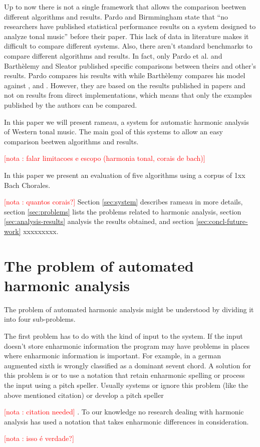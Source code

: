 \documentclass{article}
\newcounter{notacounter}
\newcommand{\nota}[1]{
  \addtocounter{notacounter}{1}
  \textcolor{red}{[nota \arabic{notacounter}: #1]}
}
\begin{document}

Up to now there is not a single framework that allows the comparison
beetwen different algorithms and results. Pardo and Birmmingham state
that ``no researchers have published statistical performance results
on a system designed to analyze tonal music''
\cite{pardo02:algorithms} before their paper. This lack of data in
literature makes it difficult to compare different systems. Also,
there aren't standard benchmarks to compare different algorithms and
results. In fact, only Pardo et al. \cite{pardo00:automated} and
Barthèlemy and Sleator \cite{barthelemy01:figured} published specific
comparisons between theirs and other's results. Pardo compares his
results with \cite{temperley99:modeling} while Barthèlemy compares his
model against \cite{maxwell92:expert}, \cite{pardo99:automated} and
\cite{temperley96:algorithm}. However, they are based on the results
published in papers and not on results from direct implementations,
which means that only the examples published by the authors can be
compared.

In this paper we will present rameau, a system for automatic harmonic
analysis of Western tonal music. The main goal of this systems to
allow an easy comparison beetwen algorithms and results. \nota{falar
  limitacoes e escopo (harmonia tonal, corais de bach)}

In this paper we present an evaluation of five algorithms using a
corpus of 1xx Bach Chorales. \nota{quantos corais?} Section
\ref{sec:system} describes rameau in more details, section
\ref{sec:problems} lists the problems related to harmonic analysis,
section \ref{sec:analysis-results} analysis the results obtained, and
section \ref{sec:concl-future-work} xxxxxxxxx.

\section{The problem of automated harmonic analysis}
\label{sec:problem}

The problem of automated harmonic analysis might be understood by
dividing it into four sub-problems. 

The first problem has to do with the kind of input to the system. If
the input doesn't store enharmonic information the program may have
problems in places where enharmonic information is important. For
example, in \cite{pardo02:algorithms} a german augmented sixth is
wrongly classified as a dominant sevent chord. A solution for this
problem is or to use a notation that retain enharmonic spelling or
process the input using a pitch speller. Usually systems or ignore
this problem (like the above mentioned citation) or develop a pitch
speller \nota{citation needed}. To our knowledge no research dealing
with harmonic analysis has used a notation that takes enharmonic
differences in consideration. \nota{isso é verdade?}
\end{document}
